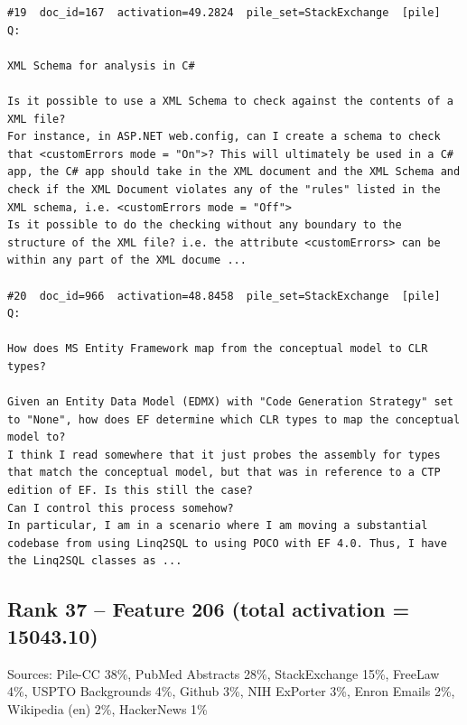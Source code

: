 \begin{verbatim}
#19  doc_id=167  activation=49.2824  pile_set=StackExchange  [pile]
Q:

XML Schema for analysis in C#

Is it possible to use a XML Schema to check against the contents of a XML file?
For instance, in ASP.NET web.config, can I create a schema to check that <customErrors mode = "On">? This will ultimately be used in a C# app, the C# app should take in the XML document and the XML Schema and check if the XML Document violates any of the "rules" listed in the XML schema, i.e. <customErrors mode = "Off">
Is it possible to do the checking without any boundary to the structure of the XML file? i.e. the attribute <customErrors> can be within any part of the XML docume ...

#20  doc_id=966  activation=48.8458  pile_set=StackExchange  [pile]
Q:

How does MS Entity Framework map from the conceptual model to CLR types?

Given an Entity Data Model (EDMX) with "Code Generation Strategy" set to "None", how does EF determine which CLR types to map the conceptual model to? 
I think I read somewhere that it just probes the assembly for types that match the conceptual model, but that was in reference to a CTP edition of EF. Is this still the case?
Can I control this process somehow?
In particular, I am in a scenario where I am moving a substantial codebase from using Linq2SQL to using POCO with EF 4.0. Thus, I have the Linq2SQL classes as ...

\end{verbatim}

\subsection*{Rank 37 -- Feature 206 (total activation = 15043.10)}

Sources: Pile-CC 38\%, PubMed Abstracts 28\%, StackExchange 15\%, FreeLaw 4\%, USPTO Backgrounds 4\%, Github 3\%, NIH ExPorter 3\%, Enron Emails 2\%, Wikipedia (en) 2\%, HackerNews 1\%

